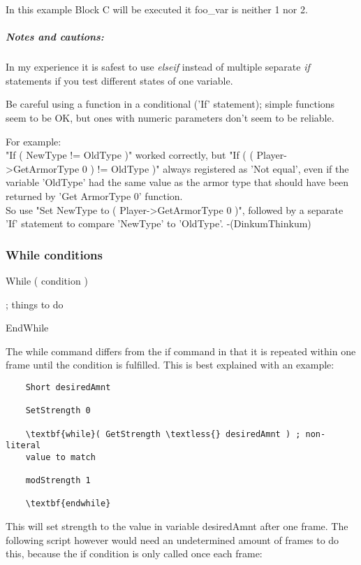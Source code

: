 In this example Block C will be executed it foo\_var is neither 1 nor 2.

\hypertarget{notes-and-cautions}{%
\subparagraph{Notes and cautions:}\label{notes-and-cautions}}

In my experience it is safest to use \emph{elseif} instead of multiple
separate \emph{if} statements if you test different states of one
variable.

Be careful using a function in a conditional ('If' statement); simple
functions seem to be OK, but ones with numeric parameters don't seem to
be reliable.

For example:\\
"If ( NewType != OldType )" worked correctly, but "If ( (
Player-\textgreater GetArmorType 0 ) != OldType )" always registered as
'Not equal', even if the variable 'OldType' had the same value as the
armor type that should have been returned by 'Get ArmorType 0'
function.\\
So use "Set NewType to ( Player-\textgreater GetArmorType 0 )", followed
by a separate 'If' statement to compare 'NewType' to 'OldType'.
-(DinkumThinkum)

\hypertarget{while-conditions}{%
\subsubsection{While conditions}\label{while-conditions}}

	While ( condition )
	
	; things to do
	
	EndWhile

The while command differs from the if command in that it is repeated
within one frame until the condition is fulfilled. This is best
explained with an example:

\begin{lstlisting}
	Short desiredAmnt
	
	SetStrength 0
	
	\textbf{while}( GetStrength \textless{} desiredAmnt ) ; non-literal
	value to match
	
	modStrength 1
	
	\textbf{endwhile}
\end{lstlisting}

This will set strength to the value in variable desiredAmnt after one
frame. The following script however would need an undetermined amount of
frames to do this, because the if condition is only called once each
frame:

